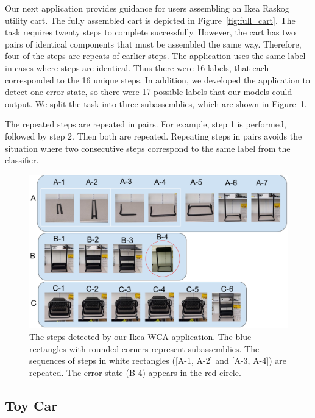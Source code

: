 Our next application provides guidance for users assembling an Ikea Raskog
utility cart.
The fully assembled cart is depicted in Figure~\ref{fig:full_cart}.
The task requires twenty steps to complete successfully.
However, the cart has two pairs of identical components that must be
assembled the same way.
Therefore, four of the steps are repeats of earlier steps.
The application uses the same label in cases where steps are identical.
Thus there were 16 labels, that each corresponded to the 16 unique steps.
In addition, we developed the application to detect one error state, so there
were 17 possible labels that our models could output.
We split the task into three subassemblies, which are shown in
Figure~\ref{fig:ikea_cart}.

The repeated steps are repeated in pairs. For example, step 1 is performed,
followed by step 2.
Then both are repeated.
Repeating steps in pairs avoids the situation where two consecutive steps
correspond to the same label from the classifier.

\begin{figure}
  \includegraphics[width=\columnwidth]{figures/ikea_subassemblies.pdf}
  \caption{
    The steps detected by our Ikea WCA application.
    The blue rectangles with rounded corners represent subassemblies.
    The sequences of steps in white rectangles ([A-1, A-2] and [A-3, A-4])
    are repeated.
    The error state (B-4) appears in the red circle.
  }\label{fig:ikea_cart}
\end{figure}

\subsection{Toy Car}

